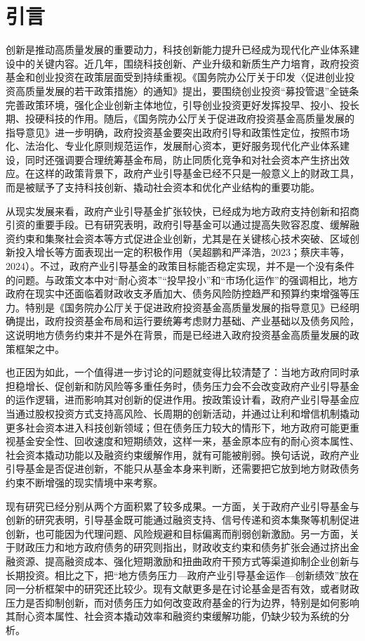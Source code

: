 
\section{引言}

创新是推动高质量发展的重要动力，科技创新能力提升已经成为现代化产业体系建设中的关键内容。近几年，围绕科技创新、产业升级和新质生产力培育，政府投资基金和创业投资在政策层面受到持续重视。《国务院办公厅关于印发〈促进创业投资高质量发展的若干政策措施〉的通知》提出，要围绕创业投资“募投管退”全链条完善政策环境，强化企业创新主体地位，引导创业投资更好发挥投早、投小、投长期、投硬科技的作用。随后，《国务院办公厅关于促进政府投资基金高质量发展的指导意见》进一步明确，政府投资基金要突出政府引导和政策性定位，按照市场化、法治化、专业化原则规范运作，发展耐心资本，更好服务现代化产业体系建设，同时还强调要合理统筹基金布局，防止同质化竞争和对社会资本产生挤出效应。在这样的政策背景下，政府产业引导基金已经不只是一般意义上的财政工具，而是被赋予了支持科技创新、撬动社会资本和优化产业结构的重要功能。

从现实发展来看，政府产业引导基金扩张较快，已经成为地方政府支持创新和招商引资的重要手段。已有研究表明，政府引导基金可以通过提高失败容忍度、缓解融资约束和集聚社会资本等方式促进企业创新，尤其是在关键核心技术突破、区域创新投入增长等方面表现出一定的积极作用（吴超鹏和严泽浩，2023；蔡庆丰等，2024）。不过，政府产业引导基金的政策目标能否稳定实现，并不是一个没有条件的问题。与政策文本中对“耐心资本”“投早投小”和“市场化运作”的强调相比，地方政府在现实中还面临着财政收支矛盾加大、债务风险防控趋严和预算约束增强等压力。特别是《国务院办公厅关于促进政府投资基金高质量发展的指导意见》已经明确提出，政府投资基金布局和运行要统筹考虑财力基础、产业基础以及债务风险，这说明地方债务约束并不是外在背景，而是已经进入政府投资基金高质量发展的政策框架之中。

也正因为如此，一个值得进一步讨论的问题就变得比较清楚了：当地方政府同时承担稳增长、促创新和防风险等多重任务时，债务压力会不会改变政府产业引导基金的运作逻辑，进而影响其对创新的促进作用。按政策设计看，政府产业引导基金应当通过股权投资方式支持高风险、长周期的创新活动，并通过让利和增信机制撬动更多社会资本进入科技创新领域；但在债务压力较大的情形下，地方政府可能更重视基金安全性、回收速度和短期绩效，这样一来，基金原本应有的耐心资本属性、社会资本撬动功能以及融资约束缓解作用，就有可能被削弱。换句话说，政府产业引导基金是否促进创新，不能只从基金本身来判断，还需要把它放到地方财政债务约束不断增强的现实情境中来考察。

现有研究已经分别从两个方面积累了较多成果。一方面，关于政府产业引导基金与创新的研究表明，引导基金既可能通过融资支持、信号传递和资本集聚等机制促进创新，也可能因为代理问题、风险规避和目标偏离而削弱创新激励。另一方面，关于财政压力和地方政府债务的研究则指出，财政收支约束和债务扩张会通过挤出金融资源、提高融资成本、强化短期激励和扭曲政府干预方式等渠道抑制企业创新与长期投资。相比之下，把“地方债务压力—政府产业引导基金运作—创新绩效”放在同一分析框架中的研究还比较少。现有文献更多是在讨论基金是否有效，或者财政压力是否抑制创新，而对债务压力如何改变政府基金的行为边界，特别是如何影响其耐心资本属性、社会资本撬动效率和融资约束缓解功能，仍缺少较为系统的分析。

